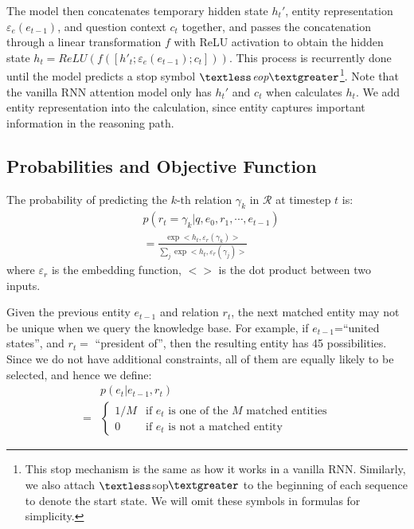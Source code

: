 The model then concatenates temporary hidden state $h_{t}'$, entity representation $\varepsilon_e(e_{t-1})$, and question context $c_t$ together, and passes the concatenation through a linear transformation $f$ with ReLU activation to obtain the hidden state $h_t=ReLU(f([h'_{t}; \varepsilon_e(e_{t-1}); c_t]))$. This process is recurrently done until the model predicts a stop symbol \textit{$\textless$eop$\textgreater$}\footnote{This stop mechanism is the same as how it works in a vanilla RNN. Similarly, we also attach $\textless$sop$\textgreater$ to the beginning of each sequence to denote the start state. We will omit these symbols in formulas for simplicity.}. Note that the vanilla RNN attention model only has $h_{t}'$ and $c_t$ when calculates $h_t$. We add entity representation into the calculation, since entity captures important information in the reasoning path. 

\subsection{Probabilities and Objective Function} 
The probability of predicting the $k$-th relation $\gamma_k$ in $\mathcal{R}$ at timestep $t$ is:
\begin{align*}
&p(r_t=\gamma_k|q,e_0,r_1,\cdots,e_{t-1})\\
 &= \frac{\exp <h_t,\varepsilon_r(\gamma_k)>}{\sum_j\exp <h_t,\varepsilon_r(\gamma_j)>}
\end{align*}
where $\varepsilon_r$ is the embedding function, $<>$ is the dot product between two inputs.


Given the previous entity $e_{t-1}$ and relation $r_t$, the next matched entity may not be unique when we query the knowledge base. %
For example, if $e_{t-1}$=``united states'', and $r_t=$ ``president of'', then the resulting entity has 45 possibilities. Since we do not have additional constraints, all of them are equally likely to be selected, and hence we define:
\begin{align}
  &p(e_t|e_{t-1},r_t)\\\nonumber
  =&\begin{cases}
  1/M & \text{if }e_t\text{ is one of the }M\text{ matched entities} \\\nonumber
  0 & \text{if }e_t\text{ is not a matched entity}
\end{cases} 
\label{eq:equal}
\end{align}

